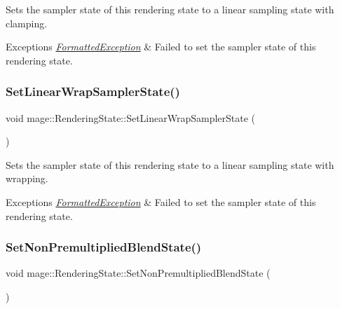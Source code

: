 Sets the sampler state of this rendering state to a linear sampling state with clamping.


\begin{DoxyExceptions}{Exceptions}
{\em \hyperlink{structmage_1_1_formatted_exception}{Formatted\+Exception}} & Failed to set the sampler state of this rendering state. \\
\hline
\end{DoxyExceptions}
\hypertarget{structmage_1_1_rendering_state_a6ffd109271b4988fa6d4a6fc2daa2125}{}\label{structmage_1_1_rendering_state_a6ffd109271b4988fa6d4a6fc2daa2125} 
\subsubsection{\texorpdfstring{Set\+Linear\+Wrap\+Sampler\+State()}{SetLinearWrapSamplerState()}}
{\footnotesize\ttfamily void mage\+::\+Rendering\+State\+::\+Set\+Linear\+Wrap\+Sampler\+State (\begin{DoxyParamCaption}{ }\end{DoxyParamCaption})}

Sets the sampler state of this rendering state to a linear sampling state with wrapping.


\begin{DoxyExceptions}{Exceptions}
{\em \hyperlink{structmage_1_1_formatted_exception}{Formatted\+Exception}} & Failed to set the sampler state of this rendering state. \\
\hline
\end{DoxyExceptions}
\hypertarget{structmage_1_1_rendering_state_acf313a797964e3a86dde2799a42f2db3}{}\label{structmage_1_1_rendering_state_acf313a797964e3a86dde2799a42f2db3} 
\subsubsection{\texorpdfstring{Set\+Non\+Premultiplied\+Blend\+State()}{SetNonPremultipliedBlendState()}}
{\footnotesize\ttfamily void mage\+::\+Rendering\+State\+::\+Set\+Non\+Premultiplied\+Blend\+State (\begin{DoxyParamCaption}{ }\end{DoxyParamCaption})}

